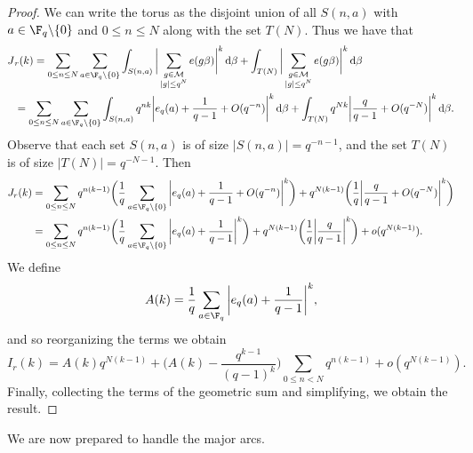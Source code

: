 \documentclass[reqno,11pt]{amsart}
\theoremstyle{definition}
\theoremstyle{remark}
\numberwithin{equation}{section}
\def\calM{{\mathcal M}}
\def\setmin{{\setminus\!\,}}
\renewcommand{\d}{\,{\rm d}} %
\newcommand{\<}{\begin{equation}}
\renewcommand{\>}{\end{equation}}
\begin{document}
\begin{proof}
    We can write the torus as the disjoint union of all $S(n,a)$ with $a \in \F_q\setmin\{0\}$ and $0\leq n \leq N$ along with the set $T(N)$. Thus we have that
    \begin{align*}
        J&_r(k) = \sum_{0\leq n\leq N} \sum_{a \in \F_q \setmin\{0\}} \int_{S(n,a)} \bigg|\sum_{\substack{g \in \calM \\ |g| \leq q^N}} e(g\beta)\bigg|^k \d\beta + \int_{T(N)} \bigg|\sum_{\substack{g \in \calM \\ |g| \leq q^N}} e(g\beta)\bigg|^k \d\beta \\
        &= \sum_{0\leq n\leq N} \sum_{a \in \F_q \setmin\{0\}} \int_{S(n,a)}q^{nk}\bigg|e_q(a) + \dfrac{1}{q-1} + O(q^{-n})\bigg|^k \d\beta + \int_{T(N)} q^{Nk}\bigg|\dfrac{q}{q-1}+O(q^{-N})\bigg|^k\d\beta.
    \end{align*}
    Observe that each set $S(n,a)$ is of size $|S(n,a)| = q^{-n-1}$, and the set $T(N)$ is of size $|T(N)| = q^{-N-1}$. Then
    \begin{align*}
        J_r(k) &= \sum_{0\leq n\leq N} q^{n(k-1)} \bigg(\dfrac{1}{q}\sum_{a \in \F_q \setmin\{0\}} \bigg|e_q(a) + \dfrac{1}{q-1} + O(q^{-n})\bigg|^k\bigg) + q^{N(k-1)}\bigg(\dfrac{1}{q}\bigg|\dfrac{q}{q-1}+O(q^{-N})\bigg|^k\bigg) \\
        &=  \sum_{0\leq n\leq N} q^{n(k-1)} \bigg(\dfrac{1}{q}\sum_{a \in \F_q \setmin\{0\}} \bigg|e_q(a) + \dfrac{1}{q-1}\bigg|^k\bigg) + q^{N(k-1)}\bigg(\dfrac{1}{q}\bigg|\dfrac{q}{q-1}\bigg|^k\bigg) + o(q^{N(k-1)}).
    \end{align*}
    We define
    \[A(k) = \dfrac{1}{q}\sum_{a \in \F_q} \bigg|e_q(a) + \dfrac{1}{q-1}\bigg|^k,\]
    and so reorganizing the terms we obtain
    \[I_r(k) = A(k)q^{N(k-1)} + \bigg(A(k) - \dfrac{q^{k-1}}{(q-1)^k}\bigg)\sum_{0 \leq n < N} q^{n(k-1)} + o(q^{N(k-1)}).\]
    Finally, collecting the terms of the geometric sum and simplifying, we obtain the result.
\end{proof}

We are now prepared to handle the major arcs.
\end{document}

